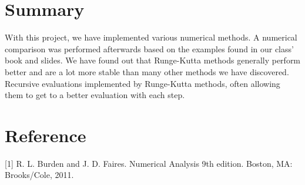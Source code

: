 \documentclass[11pt]{article}	%
\begin{document}
\section{Summary}
With this project, we have implemented various numerical methods. A numerical comparison was performed afterwards based on the examples found in our class' book and slides. We have found out that Runge-Kutta methods generally perform better and are a lot more stable than many other methods we have discovered. Recursive evaluations implemented by Runge-Kutta methods, often allowing them to get to a better evaluation with each step.  

%


\section{Reference}
[1] R. L. Burden and J. D. Faires. Numerical Analysis 9th edition. Boston, MA: Brooks/Cole, 2011.
\end{document}
